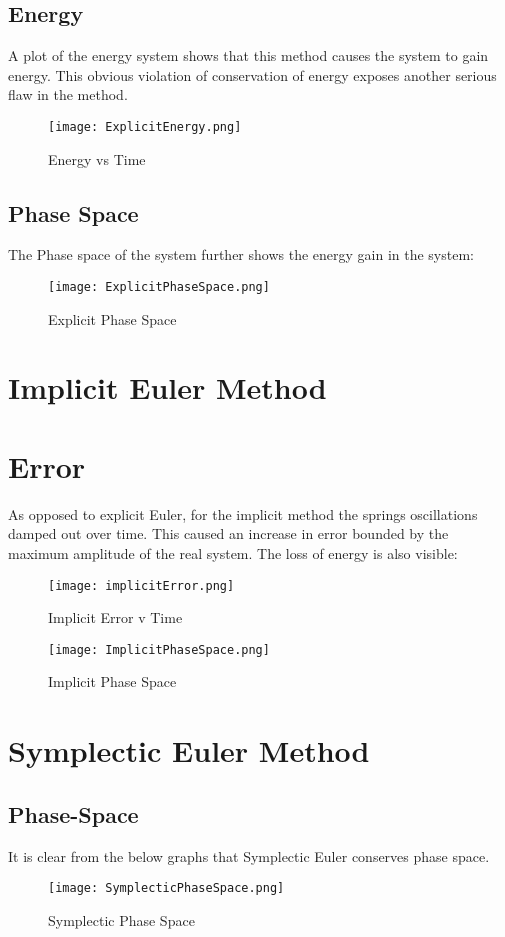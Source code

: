 \documentclass[a4paper]{article}
\begin{document}
\subsection{Energy}
A plot of the energy system shows that this method causes the system to gain energy. This obvious violation of conservation of energy exposes another serious flaw in the method.
\begin{figure}[H]
\centering
\texttt{[image: ExplicitEnergy.png]}
\caption{\label{fig: Energy} Energy vs Time}
\end{figure}
\subsection{Phase Space}
The Phase space of the system further shows the energy gain in the system:
\begin{figure}[H]
\centering
\texttt{[image: ExplicitPhaseSpace.png]}
\caption{\label{fig: ePhaseSpace} Explicit Phase Space}
\end{figure}
\section{Implicit Euler Method}
\section{Error}
As opposed to explicit Euler, for the implicit method the springs oscillations damped out over time. This caused an increase in error bounded by the maximum amplitude of the real system. The loss of energy is also visible:
\begin{figure}[H]
\centering
\texttt{[image: implicitError.png]}
\caption{\label{fig: iError} Implicit Error v Time}
\end{figure}
\begin{figure}[H]
\centering
\texttt{[image: ImplicitPhaseSpace.png]}
\caption{\label{fig: iPhseSpace} Implicit Phase Space}
\end{figure}
\section{Symplectic Euler Method}
\subsection{Phase-Space}
It is clear from the below graphs that Symplectic Euler conserves phase space.
\begin{figure}[H]
\centering
\texttt{[image: SymplecticPhaseSpace.png]}
\caption{\label{fig: sPhseSpace} Symplectic Phase Space}
\end{figure}
\end{document}

